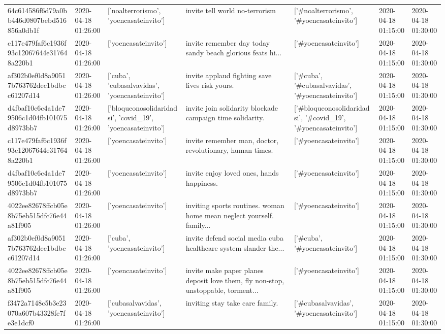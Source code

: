 \begin{tabular}{lllllll}
64c614586f6d79a0bb446d0807bebd516856a0db1f & 2020-04-18 01:26:00 & ['noalterrorismo', 'yoencasateinvito'] & invite tell world no-terrorism & ['#noalterrorismo', '#yoencasateinvito'] & 2020-04-18 01:15:00 & 2020-04-18 01:30:00 \\
c117e479faf6c1936f93c12067644e317648a220b1 & 2020-04-18 01:26:00 & ['yoencasateinvito'] & invite remember day today sandy beach glorious feats hi... & ['#yoencasateinvito'] & 2020-04-18 01:15:00 & 2020-04-18 01:30:00 \\
af302b0ef0d8a90517b763762dec1bdbcc61207d14 & 2020-04-18 01:26:00 & ['cuba', 'cubasalvavidas', 'yoencasateinvito'] & invite applaud fighting save lives risk yours. & ['#cuba', '#cubasalvavidas', '#yoencasateinvito'] & 2020-04-18 01:15:00 & 2020-04-18 01:30:00 \\
d4fbaf10c6c4a1de79506c1d04fb101075d8973bb7 & 2020-04-18 01:26:00 & ['bloqueonosolidaridadsi', 'covid_19', 'yoencasateinvito'] & invite join solidarity blockade campaign time solidarity. & ['#bloqueonosolidaridadsi', '#covid_19', '#yoencasateinvito'] & 2020-04-18 01:15:00 & 2020-04-18 01:30:00 \\
c117e479faf6c1936f93c12067644e317648a220b1 & 2020-04-18 01:26:00 & ['yoencasateinvito'] & invite remember man, doctor, revolutionary, human times. & ['#yoencasateinvito'] & 2020-04-18 01:15:00 & 2020-04-18 01:30:00 \\
d4fbaf10c6c4a1de79506c1d04fb101075d8973bb7 & 2020-04-18 01:26:00 & ['yoencasateinvito'] & invite enjoy loved ones, hands happiness. & ['#yoencasateinvito'] & 2020-04-18 01:15:00 & 2020-04-18 01:30:00 \\
4022ee82678ffcb05e8b75eb515dfc76e44a81f905 & 2020-04-18 01:26:00 & ['yoencasateinvito'] & inviting sports routines. woman home mean neglect yourself. family... & ['#yoencasateinvito'] & 2020-04-18 01:15:00 & 2020-04-18 01:30:00 \\
af302b0ef0d8a90517b763762dec1bdbcc61207d14 & 2020-04-18 01:26:00 & ['cuba', 'yoencasateinvito'] & invite defend social media cuba healthcare system slander the... & ['#cuba', '#yoencasateinvito'] & 2020-04-18 01:15:00 & 2020-04-18 01:30:00 \\
4022ee82678ffcb05e8b75eb515dfc76e44a81f905 & 2020-04-18 01:26:00 & ['yoencasateinvito'] & invite make paper planes deposit love them, fly non-stop, unstoppable, torment... & ['#yoencasateinvito'] & 2020-04-18 01:15:00 & 2020-04-18 01:30:00 \\
f3472a7148c5b3e23070a607b43328fe7fe3e1dcf0 & 2020-04-18 01:26:00 & ['cubasalvavidas', 'yoencasateinvito'] & inviting stay take care family. & ['#cubasalvavidas', '#yoencasateinvito'] & 2020-04-18 01:15:00 & 2020-04-18 01:30:00 \\

\end{tabular}
